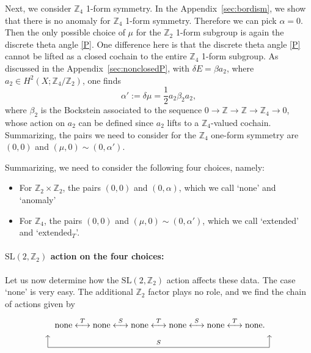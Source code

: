 \documentclass[12pt]{article}
\numberwithin{equation}{section}
\def\bZ{\mathbb{Z}}
\def\SL{\mathrm{SL}}
\begin{document}
Next, we consider $\bZ_4$ 1-form symmetry.
In the Appendix~\ref{sec:bordism}, we show that there is no anomaly for $\bZ_4$ 1-form symmetry.
Therefore we can pick $\alpha=0$. Then the only possible choice of $\mu$ for the $\bZ_2$ 1-form subgroup is again the discrete theta angle \eqref{P}.
One difference here is that the discrete theta angle \eqref{P} cannot be lifted as a closed cochain to the entire $\bZ_4$ 1-form subgroup.
As discussed in the Appendix~\ref{sec:nonclosedP}, with $\delta E=\beta a_2$,
where $a_2\in H^2(X;\bZ_4/\bZ_2)$,
one finds \begin{equation}
\alpha':=\delta \mu = %
\frac12 a_2 \beta_2 a_2,\label{anom'}
\end{equation}
where $\beta_2$ is the Bockstein associated to the sequence $0\to \bZ\to \bZ \to \bZ_4\to 0$,
whose action on $a_2$ can be defined since $a_2$ lifts to a $\bZ_4$-valued cochain.
Summarizing, the pairs  we need to consider for the $\bZ_4$ one-form symmetry are $(0,0)$ and $(\mu,0)\sim (0,\alpha')$. 

\def\Textended{extended$_T$}
Summarizing,  we need to consider the following four choices, namely:
\begin{itemize}
\item For $\bZ_2\times \bZ_2$, the pairs $(0,0)$ and $(0,\alpha)$, which we call `none' and `anomaly'
\item For $\bZ_4$, the pairs $(0,0)$ and $(\mu,0)\sim (0,\alpha')$, which we call `extended' and `\Textended'.
\end{itemize}

\paragraph{$\SL(2,\bZ_2)$ action on the four choices:}
Let us now determine how the $\SL(2,\bZ_2)$ action affects these data.
The case `none' is very easy.
The additional $\bZ_2$ factor plays no role, and we find the chain of actions given by \begin{equation}
\begin{tikzpicture}
	\node at (0,0) {$
		\text{none} \stackrel{T}{\longleftrightarrow} 
		\text{none} \stackrel{S}{\longleftrightarrow} 
		\text{none} \stackrel{T}{\longleftrightarrow} 
		\text{none} \stackrel{S}{\longleftrightarrow} 
		\text{none} \stackrel{T}{\longleftrightarrow} 
		\text{none}.
	$};
	\draw[->] (-4.6,-1) -- (-4.6,-0.5);
	\draw[->] (4.5,-1) -- (4.5,-0.5);
	\draw (-4.6,-1) -- node[above] {\scriptsize $S$} (4.5,-1);
\end{tikzpicture}
\label{trivial-chain}
\end{equation}
\end{document}
